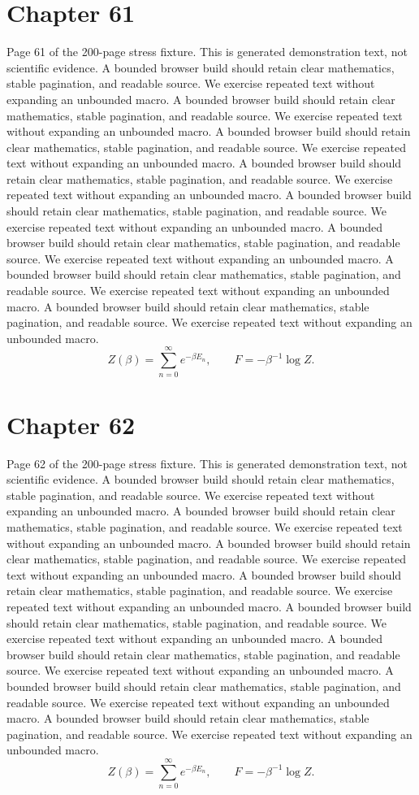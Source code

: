 \documentclass[11pt]{article}
\begin{document}
\section*{Chapter 61}
Page 61 of the 200-page stress fixture. This is generated demonstration text, not scientific evidence.
A bounded browser build should retain clear mathematics, stable pagination, and readable source. We exercise repeated text without expanding an unbounded macro.
A bounded browser build should retain clear mathematics, stable pagination, and readable source. We exercise repeated text without expanding an unbounded macro.
A bounded browser build should retain clear mathematics, stable pagination, and readable source. We exercise repeated text without expanding an unbounded macro.
A bounded browser build should retain clear mathematics, stable pagination, and readable source. We exercise repeated text without expanding an unbounded macro.
A bounded browser build should retain clear mathematics, stable pagination, and readable source. We exercise repeated text without expanding an unbounded macro.
A bounded browser build should retain clear mathematics, stable pagination, and readable source. We exercise repeated text without expanding an unbounded macro.
A bounded browser build should retain clear mathematics, stable pagination, and readable source. We exercise repeated text without expanding an unbounded macro.
A bounded browser build should retain clear mathematics, stable pagination, and readable source. We exercise repeated text without expanding an unbounded macro.
\[Z(\beta)=\sum_{n=0}^{\infty}e^{-\beta E_n},\qquad F=-\beta^{-1}\log Z.\]
\newpage
\section*{Chapter 62}
Page 62 of the 200-page stress fixture. This is generated demonstration text, not scientific evidence.
A bounded browser build should retain clear mathematics, stable pagination, and readable source. We exercise repeated text without expanding an unbounded macro.
A bounded browser build should retain clear mathematics, stable pagination, and readable source. We exercise repeated text without expanding an unbounded macro.
A bounded browser build should retain clear mathematics, stable pagination, and readable source. We exercise repeated text without expanding an unbounded macro.
A bounded browser build should retain clear mathematics, stable pagination, and readable source. We exercise repeated text without expanding an unbounded macro.
A bounded browser build should retain clear mathematics, stable pagination, and readable source. We exercise repeated text without expanding an unbounded macro.
A bounded browser build should retain clear mathematics, stable pagination, and readable source. We exercise repeated text without expanding an unbounded macro.
A bounded browser build should retain clear mathematics, stable pagination, and readable source. We exercise repeated text without expanding an unbounded macro.
A bounded browser build should retain clear mathematics, stable pagination, and readable source. We exercise repeated text without expanding an unbounded macro.
\[Z(\beta)=\sum_{n=0}^{\infty}e^{-\beta E_n},\qquad F=-\beta^{-1}\log Z.\]
\newpage
\end{document}

